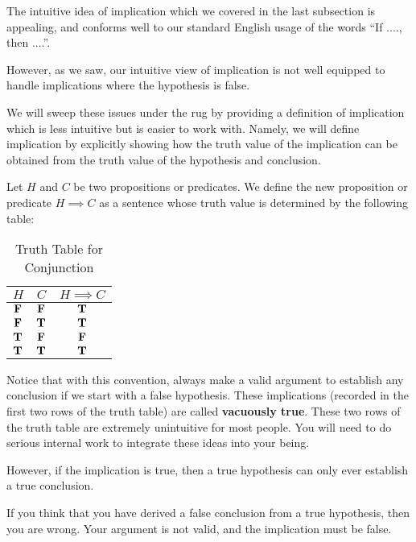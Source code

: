 The intuitive idea of implication which we covered in the last subsection is appealing, and conforms well to our standard English usage of the words ``If ...., then ....''.

However, as we saw, our intuitive view of implication is not well equipped to handle implications where the hypothesis is false.

We will sweep these issues  under the rug by providing a definition of implication which is less intuitive but is easier to work with.  Namely, we will define implication by explicitly showing how the truth value of the implication can be obtained from the truth value of the hypothesis and conclusion.

\begin{definition}
	Let $H$ and $C$ be two propositions or predicates.  We define the new proposition or predicate $H \implies C$ as a sentence whose truth value is determined by the following table:
	
	
	\begin{table}[h!]
		\begin{center}
			\caption{Truth Table for Conjunction}
			\begin{tabular}{c|c|c} 
				$H$ & $C$ & $H \implies  C$ \\
				\hline
				$\textbf{\textrm{F}}$ & $\textbf{\textrm{F}}$ & $\textbf{\textrm{T}}$ \\ 
				$\textbf{\textrm{F}}$ & $\textbf{\textrm{T}}$ & $\textbf{\textrm{T}}$ \\ 
				$\textbf{\textrm{T}}$ & $\textbf{\textrm{F}}$ & $\textbf{\textrm{F}}$ \\ 
				$\textbf{\textrm{T}}$ & $\textbf{\textrm{T}}$ & $\textbf{\textrm{T}}$ \\ 
			\end{tabular}
		\end{center}
	\end{table}
\end{definition}

Notice that with this convention, always make a valid argument to establish any conclusion if we start with a false hypothesis.  These implications (recorded in the first two rows of the truth table) are called \textbf{vacuously true}.  These two rows of the truth table are extremely unintuitive for most people.  You will need to do serious internal work to integrate these ideas into your being.

However, if the implication is true, then a true hypothesis can only ever establish a true conclusion.

If you think that you have derived a false conclusion from a true hypothesis, then you are wrong.  Your argument is not valid, and the implication must be false.

